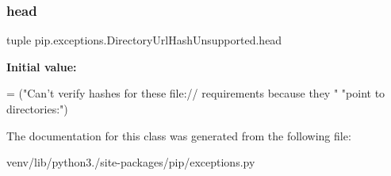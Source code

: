 \subsubsection{\texorpdfstring{head}{head}}
{\footnotesize\ttfamily tuple pip.\+exceptions.\+Directory\+Url\+Hash\+Unsupported.\+head\hspace{0.3cm}{\ttfamily [static]}}

{\bfseries Initial value\+:}
\begin{DoxyCode}
=  (\textcolor{stringliteral}{"Can't verify hashes for these file:// requirements because they "}
            \textcolor{stringliteral}{"point to directories:"})
\end{DoxyCode}


The documentation for this class was generated from the following file\+:\begin{DoxyCompactItemize}
\item 
venv/lib/python3./site-\/packages/pip/exceptions.\+py\end{DoxyCompactItemize}
